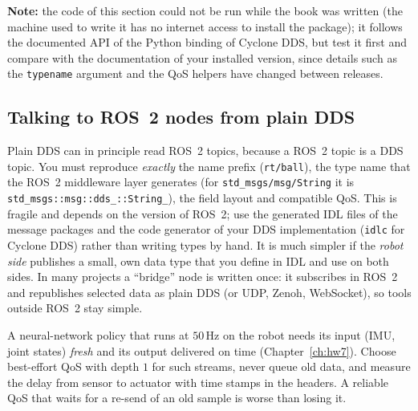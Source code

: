 \textbf{Note:} the code of this section could not be run while the book was written (the machine used to write it has no internet access to install the package); it follows the documented API of the Python binding of Cyclone DDS, but test it first and compare with the documentation of your installed version, since details such as the \verb!typename! argument and the QoS helpers have changed between releases.

\subsection*{Talking to ROS~2 nodes from plain DDS}
Plain DDS can in principle read ROS~2 topics, because a ROS~2 topic is a DDS topic. You must reproduce \emph{exactly} the name prefix (\verb!rt/ball!), the type name that the ROS~2 middleware layer generates (for \verb!std_msgs/msg/String! it is \verb!std_msgs::msg::dds_::String_!), the field layout and compatible QoS. This is fragile and depends on the version of ROS~2; use the generated IDL files of the message packages and the code generator of your DDS implementation (\verb!idlc! for Cyclone DDS) rather than writing types by hand. It is much simpler if the \emph{robot side} publishes a small, own data type that you define in IDL and use on both sides. In many projects a ``bridge'' node is written once: it subscribes in ROS~2 and republishes selected data as plain DDS (or UDP, Zenoh, WebSocket), so tools outside ROS~2 stay simple.

\begin{aibox}
A neural-network policy that runs at $50$\,Hz on the robot needs its input (IMU, joint states) \emph{fresh} and its output delivered on time (Chapter~\ref{ch:hw7}). Choose best-effort QoS with depth $1$ for such streams, never queue old data, and measure the delay from sensor to actuator with time stamps in the headers. A reliable QoS that waits for a re-send of an old sample is worse than losing it.
\end{aibox}

